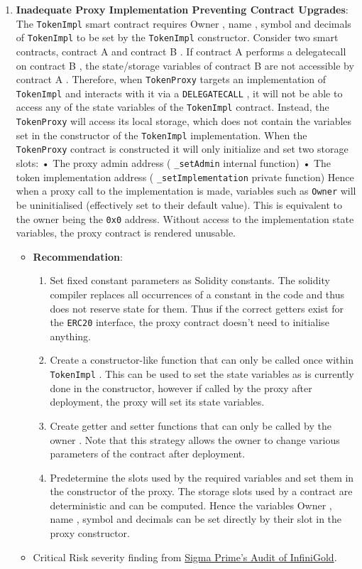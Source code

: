 \begin{enumerate}
\item\textbf{Inadequate Proxy Implementation Preventing Contract Upgrades}: The \verb|TokenImpl| smart contract requires Owner , name , symbol and decimals of \verb|TokenImpl| to be set by the \verb|TokenImpl| constructor. Consider two smart contracts, contract A and contract B . If contract A performs a delegatecall on contract B , the state/storage variables of contract B are not accessible by contract A . Therefore, when \verb|TokenProxy| targets an implementation of \verb|TokenImpl| and interacts with it via a \verb|DELEGATECALL| , it will not be able to access any of the state variables of the \verb|TokenImpl| contract. Instead, the \verb|TokenProxy| will access its local storage, which does not contain the variables set in the constructor of the \verb|TokenImpl| implementation. When the \verb|TokenProxy| contract is constructed it will only initialize and set two storage slots: • The proxy admin address ( \verb|_setAdmin| internal function) • The token implementation address ( \verb|_setImplementation| private function) Hence when a proxy call to the implementation is made, variables such as \verb|Owner| will be uninitialised (effectively set to their default value). This is equivalent to the owner being the \verb|0x0| address. Without access to the implementation state variables, the proxy contract is rendered unusable.
	\begin{itemize}
	\item\textbf{Recommendation}:
	    \begin{enumerate}
	    \item Set fixed constant parameters as Solidity constants. The solidity compiler replaces all occurrences of a constant in the code and thus does not reserve state for them. Thus if the correct getters exist for the \verb|ERC20| interface, the proxy contract doesn’t need to initialise anything.
	    \item Create a constructor-like function that can only be called once within \verb|TokenImpl| . This can be used to set the state variables as is currently done in the constructor, however if called by the proxy after deployment, the proxy will set its state variables.
	    \item Create getter and setter functions that can only be called by the owner . Note that this strategy allows the owner to change various parameters of the contract after deployment.
	    \item Predetermine the slots used by the required variables and set them in the constructor of the proxy. The storage slots used by a contract are deterministic and can be computed. Hence the variables Owner , name , symbol and decimals can be set directly by their slot in the proxy constructor.
	    \end{enumerate}
	\item Critical Risk severity finding from \href{https://github.com/sigp/public-audits/raw/master/infinigold/review.pdf}{Sigma Prime's Audit of InfiniGold}.
	\end{itemize}


\end{enumerate}
